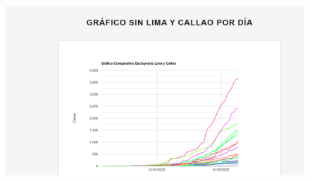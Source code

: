 \documentclass{article}
\begin{document}
\begin{figure}[h]
\centering
\includegraphics[width=0.75\linewidth]{latex/ultima.png}
\caption{}
\label{fig:enter-label}
\end{figure}





	

			
\end{document}
